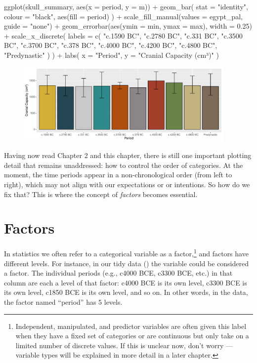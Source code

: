 \begin{inR}
ggplot(skull_summary, aes(x = period, y = m)) +
  geom_bar(
    stat = "identity",
    colour = "black",
    aes(fill = period)
  ) +
  scale_fill_manual(values = egypt_pal, guide = "none") +
  geom_errorbar(aes(ymin = min, ymax = max), width = 0.25) +
  scale_x_discrete(
    labels = c(
      "c.1590 BC", "c.2780 BC", "c.331 BC", "c.3500 BC", "c.3700 BC",
      "c.378 BC", "c.4000 BC", "c.4200 BC", "c.4800 BC", "Predynastic"
    )
  ) +
  labs(
    x = "Period",
    y = "Cranial Capacity (cm³)"
  )
\end{inR}

\vspace{2em}

\begin{figure}[H]
\includegraphics[width = 0.95\textwidth]{graphics/ch3Figs/bar_5.pdf}
\end{figure}

Having now read Chapter 2 and this chapter, there is still one important plotting detail that remains unaddressed: how to control the order of categories. At the moment, the time periods appear in a non-chronological order (from left to right), which may not align with our expectations or or intentions. So how do we fix that? This is where the concept of \textit{factors} becomes essential.

\section{Factors}

In statistics we often refer to a categorical variable as a \gls{factor},\footnote{Independent, manipulated, and predictor variables are often given this label when they have a fixed set of categories or are continuous but only take on a limited number of discrete values. If this is unclear now, don't worry — variable types will be explained in more detail in a later chapter.} and factors have different \glspl{level}.  For instance, in our tidy data () the variable  could be considered a factor. The individual periods (e.g., c4000 BCE, c3300 BCE, etc.) in that column are each a level of that factor: c4000 BCE is its own level, c3300 BCE is its own level, c1850 BCE is its own level, and so on. In other words, in the  data, the factor named ``period'' has 5 levels.


